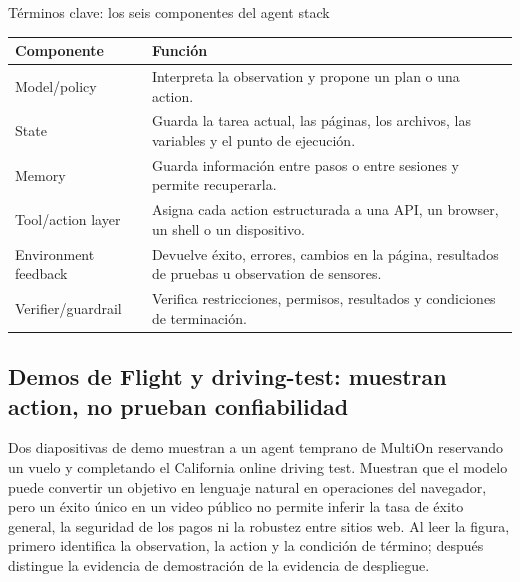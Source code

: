 \begin{knowledgebox}{Términos clave: los seis componentes del agent stack}
\begin{tabularx}{\textwidth}{L{0.19\textwidth} X}
\toprule
Componente & Función \\
\midrule
Model/policy & Interpreta la observation y propone un plan o una action. \\
State & Guarda la tarea actual, las páginas, los archivos, las variables y el punto de ejecución. \\
Memory & Guarda información entre pasos o entre sesiones y permite recuperarla. \\
Tool/action layer & Asigna cada action estructurada a una API, un browser, un shell o un dispositivo. \\
Environment feedback & Devuelve éxito, errores, cambios en la página, resultados de pruebas u observation de sensores. \\
Verifier/guardrail & Verifica restricciones, permisos, resultados y condiciones de terminación. \\
\bottomrule
\end{tabularx}
\end{knowledgebox}


\subsection{Demos de Flight y driving-test: muestran action, no prueban confiabilidad}

Dos diapositivas de demo muestran a un agent temprano de MultiOn reservando un vuelo y completando el California online driving test. Muestran que el modelo puede convertir un objetivo en lenguaje natural en operaciones del navegador, pero un éxito único en un video público no permite inferir la tasa de éxito general, la seguridad de los pagos ni la robustez entre sitios web. Al leer la figura, primero identifica la observation, la action y la condición de término; después distingue la evidencia de demostración de la evidencia de despliegue.


